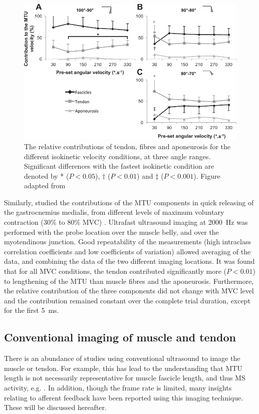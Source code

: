 	\begin{figure}[t]
		\centering
		\includegraphics[width=.8\linewidth]{Figures/mtu_imaging/hauraix_2013_mtu_contrib.pdf}
		\caption{The relative contributions of tendon, fibres and aponeurosis for the different isokinetic velocity conditions, at three angle ranges. Significant differences with the fastest isokinetic condition are denoted by * ($P<0.05$), $\dag$ ($P<0.01$) and $\ddag$ ($P<0.001$). Figure adapted from \citet{hauraix_shortening_2013}}
		\label{fig:hauraix_2013_contrib}
	\end{figure}

Similarly, \citeauthor{farcy_interaction_2014} studied the contributions of the MTU components in quick releasing of the gastrocnemius medialis, from different levels of maximum voluntary contraction (30\% to 80\% MVC) \cite{farcy_interaction_2014}. Ultrafast ultrasound imaging at \SI{2000}{\hertz} was performed with the probe location over the muscle belly, and over the myotendinous junction. Good repeatability of the measurements (high intraclass correlation coefficients and low coefficients of variation) allowed averaging of the data, and combining the data of the two different imaging locations. It was found that for all MVC conditions, the tendon contributed significantly more ($P<0.01$) to lengthening of the MTU than muscle fibres and the aponeurosis. 
Furthermore, the relative contribution of the three components did not change with MVC level and the contribution remained constant over the complete trial duration, except for the first \SI{5}{\milli\second}.






\subsection{Conventional imaging of muscle and tendon}
There is an abundance of studies using conventional ultrasound to image the muscle or tendon. For example, this has lead to the understanding that MTU length is not necessarily representative for muscle fascicle length, and thus MS activity, e.g. \cite{maas_is_2009, cronin_automatic_2011}. In addition, though the frame rate is limited, many insights relating to afferent feedback have been reported using this imaging technique. These will be discussed hereafter. 



